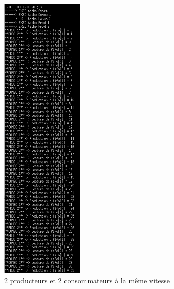 \documentclass[a4paper,12pt]{report}
\begin{document}
\begin{figure}[h]
	\centering
		\includegraphics[width=0.35\textwidth]{screens/prod_conso_meme_vitesse_sem_2prod_meme_vitesse_2conso_meme_vitesse_TRAFIK.png}
		\caption{2 producteurs et 2 consommateurs à la même vitesse}
		\label{prod_conso_meme_vitesse_sem_2prod_meme_vitesse_2conso_meme_vitesse_TRAFIK}
\end{figure}

\newpage
\end{document}
